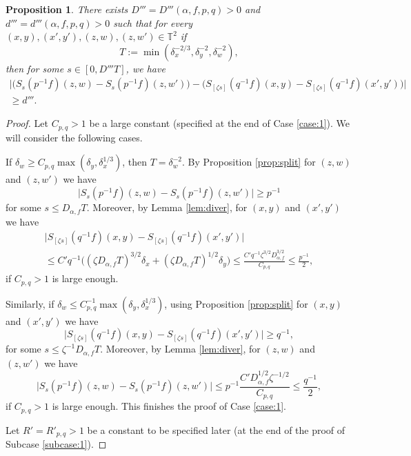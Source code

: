 \documentclass[JEP,XML,SOM,Unicode,NoEqCountersInSection]{cedram}
\newcounter{case}
\newcounter{subcase}
\theoremstyle{definition}
\theoremstyle{plain}
\newtheorem{proposition}[definition]{Proposition}
\newcommand\TT{\mathbb{T}}
\begin{document}
\begin{proposition}\label{prop:cruc} There exists $D'''\!=\!D'''(\alpha,f,p,q)>0$ and \hbox{$d'''\!=\!d'''(\alpha,f,p,q)>0$} such that for every $(x,y),(x',y'),(z,w),(z,w')\in \TT^2$ if
\[
T:=\min(\delta_{x}^{-2/3},\delta_{y}^{-2},\delta_{w}^{-2}),
\]
then for some $s\in [0,D'''T]$, we have
\begin{multline}\label{eq:nwc}
\bigl|\bigl(S_s(p^{-1}f)(z,w)\!-\!S_s(p^{-1}f)(z,w')\bigr)\!-\!
\bigl(S_{[\zeta s]}(q^{-1}f)(x,y)\!-\!S_{[\zeta s]}(q^{-1}f)(x',y')\bigr)\bigr|\\
\geq
d'''.
\end{multline}
\end{proposition}
\begin{proof} Let $C_{p,q}>1$ be a large constant (specified at the end of Case \ref{case:1}).
We will consider the following cases.

\label{case:1}

If $\delta_w\geq C_{p,q}\max(\delta_y,\delta_x^{1/3})$, then $T=\delta_w^{-2}$. By Proposition \ref{prop:split} for $(z,w)$ and $(z,w')$ we have
\[
\bigl|S_s(p^{-1}f)(z,w)-S_s(p^{-1}f)(z,w')\bigr|\geq p^{-1}
\]
for some $s\leq D_{\alpha,f}T$. Moreover, by Lemma \ref{lem:diver}, for $(x,y)$ and $(x',y')$ we have
\begin{multline*}
\bigl|S_{[\zeta s]}(q^{-1}f)(x,y)-S_{[\zeta s]}(q^{-1}f)(x',y')\bigr| \\[-5pt] \leq C'q^{-1}\bigl((\zeta D_{\alpha,f}T)^{3/2}\delta_x+(\zeta D_{\alpha,f}T)^{1/2}\delta_y\bigr)\leq
\frac{C'q^{-1}\zeta^{3/2}D_{\alpha,f}^{3/2}}{C_{p,q}}\leq \frac{p^{-1}}{2},
\end{multline*}
if $C_{p,q}>1$ is large enough.

Similarly, if $\delta_w\leq C_{p,q}^{-1}\max(\delta_y,\delta_x^{1/3})$, using Proposition \ref{prop:split} for $(x,y)$ and $(x',y')$ we have
\[
\bigl|S_{[\zeta s]}(q^{-1}f)(x,y)-S_{[\zeta s]}(q^{-1}f)(x',y')\bigr|\geq q^{-1},
\]
for some $s\leq \zeta^{-1}D_{\alpha,f}T$. Moreover, by Lemma \ref{lem:diver}, for $(z,w)$ and $(z,w')$ we have
\[
\bigl|S_s(p^{-1}f)(z,w)-S_s(p^{-1}f)(z,w')\bigr|\leq p^{-1}\frac{C' D_{\alpha,f}^{1/2}\zeta^{-1/2}}{C_{p,q}}\leq \frac{q^{-1}}{2},
\]
if $C_{p,q}>1$ is large enough.
This finishes the proof of Case \ref{case:1}.

\label{case:2}
Let $R'=R'_{p,q}>1$ be a constant to be specified later (at the end of the proof of Subcase \ref{subcase:1}).


\end{proof}
\end{document}
